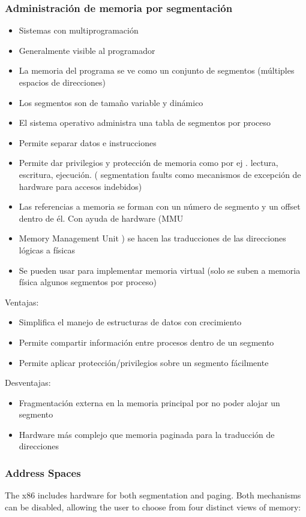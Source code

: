 \subsubsection{Administración de memoria por segmentación}
\begin{itemize}
\item Sistemas con multiprogramación
\item Generalmente visible al programador
\item La memoria del programa se ve como un conjunto de segmentos (múltiples espacios de direcciones)
\item Los segmentos son de tamaño variable y dinámico
\item El sistema operativo administra una tabla de segmentos por proceso
\item Permite separar datos e instrucciones
\item Permite dar privilegios y protección de memoria como por ej . lectura, escritura, ejecución. ( segmentation faults como mecanismos de excepción de hardware para accesos indebidos)
\item Las referencias a memoria se forman con un número de segmento y un offset dentro de él. Con ayuda de hardware (MMU \item Memory Management Unit ) se hacen las traducciones de las direcciones lógicas a físicas
\item Se pueden usar para implementar memoria virtual (solo se suben a
memoria física algunos segmentos por proceso)
\end{itemize}

Ventajas:
\begin{itemize}
\item Simplifica el manejo de estructuras de datos con crecimiento
\item Permite compartir información entre procesos dentro de un segmento
\item Permite aplicar protección/privilegios sobre un segmento fácilmente
\end{itemize}
Desventajas:
\begin{itemize}
\item Fragmentación externa en la memoria principal por no poder alojar un segmento
\item Hardware más complejo que memoria paginada para la traducción de direcciones
\end{itemize}

\subsubsection{Address Spaces}
The x86 includes hardware for both segmentation and paging. Both mechanisms can
be disabled, allowing the user to choose from four distinct views of memory:

